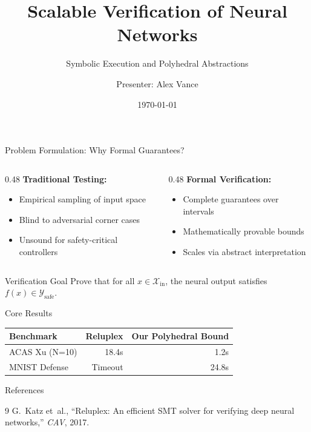 \documentclass[aspectratio=169,10pt]{beamer}
\title{Scalable Verification of Neural Networks}
\subtitle{Symbolic Execution and Polyhedral Abstractions}
\author{Presenter: Alex Vance}
\institute{Institute for Advanced Computation}
\date{\today}
\newcommand{\pos}[1]{\textcolor{positive}{#1}}
\newcommand{\con}[1]{\textcolor{negative}{#1}}
\newcommand{\HL}[1]{\textcolor{emphasis}{#1}}
\begin{document}
\begin{frame}
  \titlepage
\end{frame}

\begin{frame}{Problem Formulation: Why Formal Guarantees?}
  \begin{columns}[T]
    \begin{column}{0.48\textwidth}
      \textbf{Traditional Testing:}
      \begin{itemize}
        \item Empirical sampling of input space
        \item \con{Blind to adversarial corner cases}
        \item Unsound for safety-critical controllers
      \end{itemize}
    \end{column}
    \begin{column}{0.48\textwidth}
      \textbf{Formal Verification:}
      \begin{itemize}
        \item Complete guarantees over intervals
        \item \pos{Mathematically provable bounds}
        \item Scales via abstract interpretation
      \end{itemize}
    \end{column}
  \end{columns}

  \vspace{1em}
  \begin{block}{Verification Goal}
    Prove that for all $x \in \mathcal{X}_{\text{in}}$, the neural output satisfies $f(x) \in \mathcal{Y}_{\text{safe}}$.
  \end{block}
\end{frame}

\begin{frame}{Core Results}
  \begin{table}
    \centering
    \begin{tabular}{lrr}
      \toprule
      Benchmark & Reluplex & Our Polyhedral Bound \\
      \midrule
      ACAS Xu (N=10) & 18.4s & \HL{1.2s} \\
      MNIST Defense & Timeout & \HL{24.8s} \\
      \bottomrule
    \end{tabular}
  \end{table}
\end{frame}

\begin{frame}{References}
  \begin{thebibliography}{9}
    G.~Katz et~al., ``Reluplex: An efficient SMT solver for verifying deep neural networks,'' \textit{CAV}, 2017.
  \end{thebibliography}
\end{frame}
\end{document}

